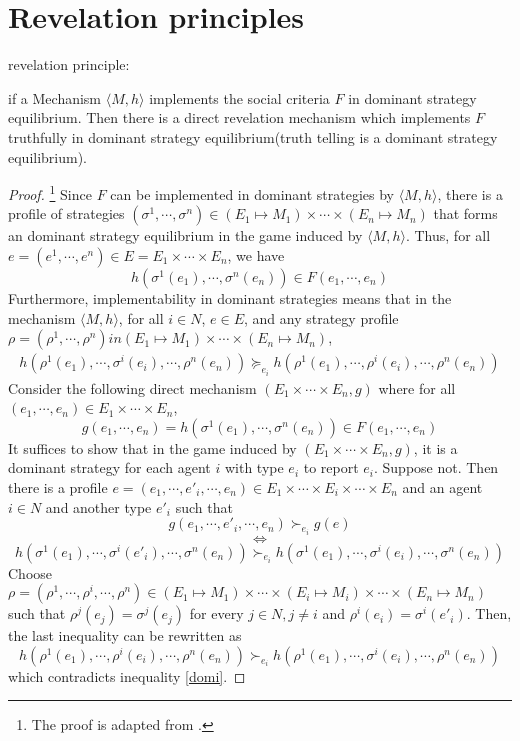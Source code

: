 
\chapter{Revelation principles} %

\label{Appendix_A} %

\begin{thm*}
revelation principle:

if a Mechanism $\langle M, h\rangle$ implements the social criteria 
$F$ in dominant strategy
equilibrium. Then there is a direct revelation mechanism which
implements $F$ truthfully in dominant strategy equilibrium(truth
telling is a dominant strategy equilibrium). 

\end{thm*}
\begin{proof}
  \footnote{The proof is adapted from \parencite{Vohra2011}.}
 Since $F$ can be implemented in dominant strategies by  $\langle M, h\rangle$, there is a profile of strategies $(\sigma^1,\cdots,
 \sigma^n)\in (E_1\mapsto M_1)\times \cdots\times (E_n\mapsto M_n)$
 that forms an dominant strategy  equilibrium in the game induced by $\langle M, h\rangle$. Thus, for
 all $e=(e^1, \cdots,e^n)\in E=E_1\times \cdots\times E_n$, we have
 $$h(\sigma^1(e_1),\cdots,\sigma^n(e_n))\in F(e_1,\cdots,e_n)$$
 Furthermore, implementability in dominant strategies means that  in
 the mechanism $\langle M, h\rangle$, for
 all $i\in N$, $e\in E$, and any  strategy profile
 $\rho=(\rho^1,\cdots,\rho^n) in (E_1\mapsto M_1)\times \cdots\times (E_n\mapsto M_n)$,
 \begin{align}\label{domi}
 h(\rho^1(e_1),\cdots,\sigma^i(e_i),\cdots,\rho^n(e_n)) \succeq_{e_i} h(\rho^1(e_1),\cdots,\rho^i(e_i),\cdots,\rho^n(e_n))
 \end{align}
Consider the following direct mechanism $(E_1\times\cdots\times E_n, g)$ where for all $(e_1,\cdots,e_n)\in E_1\times\cdots\times E_n$,
$$g(e_1,\cdots,e_n)=h(\sigma^1(e_1),\cdots,\sigma^n(e_n))\in F(e_1,\cdots,e_n)$$
It suffices to show that in the game induced by
$(E_1\times\cdots\times E_n, g)$, it is a dominant strategy  for each agent 
$i$ with type $e_i$ to report $e_i$. Suppose not. Then there is a
profile $e=(e_1,\cdots, e'_i, \cdots, e_n)\in E_1\times\cdots \times
E_i \times \cdots \times E_n$ and an
agent $i\in N$ and another type $e'_i$ such that
$$g(e_1, \cdots, e'_i, \cdots, e_n) \succ_{e_i} g(e)$$
$$\Longleftrightarrow$$
$$h(\sigma^1(e_1),\cdots,\sigma^i(e'_i),\cdots,\sigma^n(e_n))\succ_{e_i} h(\sigma^1(e_1),\cdots,\sigma^i(e_i),\cdots,\sigma^n(e_n))$$
Choose  $\rho=(\rho^1,\cdots,\rho^i,\cdots,
 \rho^n)\in (E_1\mapsto M_1)\times \cdots\times (E_i\mapsto M_i)
 \times \cdots\times (E_n\mapsto M_n)$ such that
 $\rho^j(e_j)=\sigma^j(e_j)$ for every $j \in N, j\not = i$ and $\rho^i(e_i)=\sigma^i(e'_i)$. Then, the last inequality can be rewritten as
$$h(\rho^1(e_1),\cdots,\rho^i(e_i),\cdots,\rho^n(e_n))\succ_{e_i}h(\rho^1(e_1),\cdots,\sigma^i(e_i),\cdots,\rho^n(e_n))$$
which contradicts inequality \ref{domi}.
 \end{proof}

